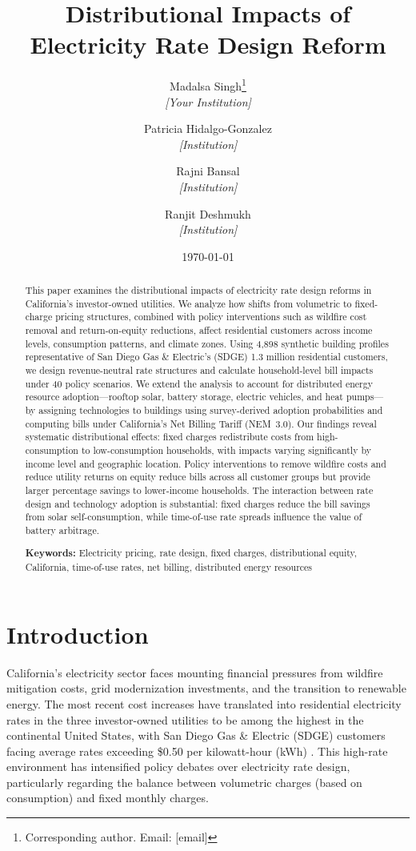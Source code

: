 \documentclass[12pt]{article}
\title{Distributional Impacts of Electricity Rate Design Reform }
\author{
Madalsa Singh\thanks{Corresponding author. Email: [email]} \\
\textit{[Your Institution]} \\
\and
Patricia Hidalgo-Gonzalez \\
\textit{[Institution]} \\
\and
Rajni Bansal \\
\textit{[Institution]}\\
\and
Ranjit Deshmukh \\
\textit{[Institution]}
}
\date{\today}
\begin{document}
\maketitle
\begin{abstract}
This paper examines the distributional impacts of electricity rate design reforms in California's investor-owned utilities. We analyze how shifts from volumetric to fixed-charge pricing structures, combined with policy interventions such as wildfire cost removal and return-on-equity reductions, affect residential customers across income levels, consumption patterns, and climate zones. Using 4,898 synthetic building profiles representative of San Diego Gas \& Electric's (SDGE) 1.3 million residential customers, we design revenue-neutral rate structures and calculate household-level bill impacts under 40 policy scenarios. We extend the analysis to account for distributed energy resource adoption---rooftop solar, battery storage, electric vehicles, and heat pumps---by assigning technologies to buildings using survey-derived adoption probabilities and computing bills under California's Net Billing Tariff (NEM~3.0). Our findings reveal systematic distributional effects: fixed charges redistribute costs from high-consumption to low-consumption households, with impacts varying significantly by income level and geographic location. Policy interventions to remove wildfire costs and reduce utility returns on equity reduce bills across all customer groups but provide larger percentage savings to lower-income households. The interaction between rate design and technology adoption is substantial: fixed charges reduce the bill savings from solar self-consumption, while time-of-use rate spreads influence the value of battery arbitrage.

\textbf{Keywords:} Electricity pricing, rate design, fixed charges, distributional equity, California, time-of-use rates, net billing, distributed energy resources
\end{abstract}

\section{Introduction}
California's electricity sector faces mounting financial pressures from wildfire mitigation costs, grid modernization investments, and the transition to renewable energy. The most recent cost increases have translated into residential electricity rates in the three investor-owned utilities to be among the highest in the continental United States, with San Diego Gas \& Electric (SDGE) customers facing average rates exceeding \$0.50 per kilowatt-hour (kWh) \citep{[citation needed]}. This high-rate environment has intensified policy debates over electricity rate design, particularly regarding the balance between volumetric charges (based on consumption) and fixed monthly charges.
\end{document}
